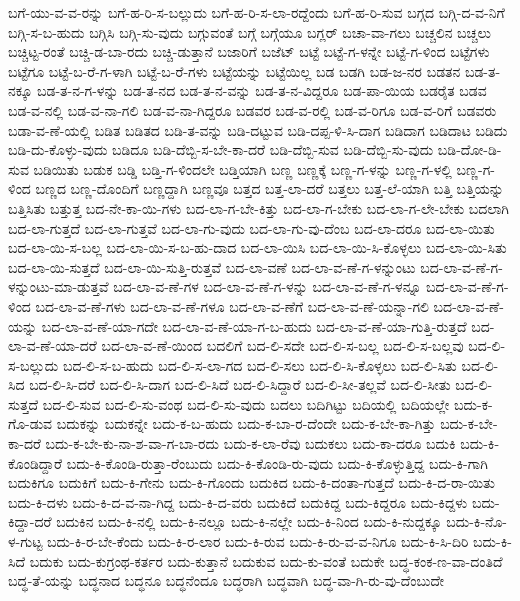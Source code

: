 {ಬಗೆ-ಯು-ವ-ವ-ರನ್ನು
ಬಗೆ-ಹ-ರಿ-ಸ-ಬಲ್ಲುದು
ಬಗೆ-ಹ-ರಿ-ಸ-ಲಾ-ರದ್ದೆಂದು
ಬಗೆ-ಹ-ರಿ-ಸುವ
ಬಗ್ಗದ
ಬಗ್ಗಿ-ದ-ವ-ನಿಗೆ
ಬಗ್ಗಿ-ಸ-ಬ-ಹುದು
ಬಗ್ಗಿಸಿ
ಬಗ್ಗಿ-ಸು-ವುದು
ಬಗ್ಗುವಂತೆ
ಬಗ್ಗೆ
ಬಗ್ಗೆಯೂ
ಬಗ್ಲರ್
ಬಚಾ-ವಾ-ಗಲು
ಬಚ್ಚಲಿನ
ಬಚ್ಚಲು
ಬಚ್ಚಿಟ್ಟ-ರಂತೆ
ಬಚ್ಚಿ-ಡ-ಬಾ-ರದು
ಬಚ್ಚಿ-ಡುತ್ತಾನೆ
ಬಜಾರಿಗೆ
ಬಜೆಟ್
ಬಟ್ಟೆ
ಬಟ್ಟೆ-ಗ-ಳನ್ನೇ
ಬಟ್ಟೆ-ಗ-ಳಿಂದ
ಬಟ್ಟೆಗಳು
ಬಟ್ಟೆಗೂ
ಬಟ್ಟೆ-ಬ-ರೆ-ಗ-ಳಾಗಿ
ಬಟ್ಟೆ-ಬ-ರೆ-ಗಳು
ಬಟ್ಟೆಯನ್ನು
ಬಟ್ಟೆಯಿಲ್ಲ
ಬಡ
ಬಡಗಿ
ಬಡ-ಜ-ನರ
ಬಡತನ
ಬಡ-ತ-ನಕ್ಕೂ
ಬಡ-ತ-ನ-ಗ-ಳನ್ನು
ಬಡ-ತ-ನದ
ಬಡ-ತ-ನ-ವನ್ನು
ಬಡ-ತ-ನ-ವಿದ್ದರೂ
ಬಡ-ಪಾ-ಯಿಯ
ಬಡರೈತ
ಬಡವ
ಬಡ-ವ-ನಲ್ಲಿ
ಬಡ-ವ-ನಾ-ಗಲಿ
ಬಡ-ವ-ನಾ-ಗಿದ್ದರೂ
ಬಡವರ
ಬಡ-ವ-ರಲ್ಲಿ
ಬಡ-ವ-ರಿಗೂ
ಬಡ-ವ-ರಿಗೆ
ಬಡವರು
ಬಡಾ-ವ-ಣೆ-ಯಲ್ಲಿ
ಬಡಿತ
ಬಡಿತದ
ಬಡಿ-ತ-ವನ್ನು
ಬಡಿ-ದಟ್ಟುವ
ಬಡಿ-ದಪ್ಪ-ಳಿ-ಸಿ-ದಾಗ
ಬಡಿದಾಗ
ಬಡಿದಾಟ
ಬಡಿದು
ಬಡಿ-ದು-ಕೊಳ್ಳು-ವುದು
ಬಡಿದೂ
ಬಡಿ-ದೆಬ್ಬಿ-ಸ-ಬೇ-ಕಾ-ದರೆ
ಬಡಿ-ದೆಬ್ಬಿ-ಸುವ
ಬಡಿ-ದೆಬ್ಬಿ-ಸು-ವುದು
ಬಡಿ-ದೋ-ಡಿ-ಸುವ
ಬಡಿಯಿತು
ಬಡುಕ
ಬಡ್ಡಿ
ಬಡ್ತಿ-ಗ-ಳಿಂದಲೇ
ಬಡ್ತಿಯಾಗಿ
ಬಣ್ಣ
ಬಣ್ಣಕ್ಕೆ
ಬಣ್ಣ-ಗ-ಳನ್ನು
ಬಣ್ಣ-ಗ-ಳಲ್ಲಿ
ಬಣ್ಣ-ಗ-ಳಿಂದ
ಬಣ್ಣದ
ಬಣ್ಣ-ದೊಂದಿಗೆ
ಬಣ್ಣದ್ದಾಗಿ
ಬಣ್ಣವೂ
ಬತ್ತದ
ಬತ್ತ-ಲಾ-ದರೆ
ಬತ್ತಲು
ಬತ್ತ-ಲೆ-ಯಾಗಿ
ಬತ್ತಿ
ಬತ್ತಿಯನ್ನು
ಬತ್ತಿಸಿತು
ಬತ್ತುತ್ತ
ಬದ-ನೇ-ಕಾ-ಯಿ-ಗಳು
ಬದ-ಲಾ-ಗ-ಬೇ-ಕಿತ್ತು
ಬದ-ಲಾ-ಗ-ಬೇಕು
ಬದ-ಲಾ-ಗ-ಲೇ-ಬೇಕು
ಬದಲಾಗಿ
ಬದ-ಲಾ-ಗುತ್ತದೆ
ಬದ-ಲಾ-ಗುತ್ತವೆ
ಬದ-ಲಾ-ಗು-ವುದು
ಬದ-ಲಾ-ಗು-ವು-ದೆಂಬ
ಬದ-ಲಾ-ದರೂ
ಬದ-ಲಾ-ಯಿತು
ಬದ-ಲಾ-ಯಿ-ಸ-ಬಲ್ಲ
ಬದ-ಲಾ-ಯಿ-ಸ-ಬ-ಹು-ದಾದ
ಬದ-ಲಾ-ಯಿಸಿ
ಬದ-ಲಾ-ಯಿ-ಸಿ-ಕೊಳ್ಳಲು
ಬದ-ಲಾ-ಯಿ-ಸಿತು
ಬದ-ಲಾ-ಯಿ-ಸುತ್ತದೆ
ಬದ-ಲಾ-ಯಿ-ಸುತ್ತಿ-ರುತ್ತವೆ
ಬದ-ಲಾ-ವಣೆ
ಬದ-ಲಾ-ವ-ಣೆ-ಗ-ಳನ್ನುಂಟು
ಬದ-ಲಾ-ವ-ಣೆ-ಗ-ಳನ್ನುಂಟು-ಮಾ-ಡುತ್ತವೆ
ಬದ-ಲಾ-ವ-ಣೆ-ಗಳ
ಬದ-ಲಾ-ವ-ಣೆ-ಗ-ಳನ್ನು
ಬದ-ಲಾ-ವ-ಣೆ-ಗ-ಳನ್ನೂ
ಬದ-ಲಾ-ವ-ಣೆ-ಗ-ಳಿಂದ
ಬದ-ಲಾ-ವ-ಣೆ-ಗಳು
ಬದ-ಲಾ-ವ-ಣೆ-ಗಳೂ
ಬದ-ಲಾ-ವ-ಣೆಗೆ
ಬದ-ಲಾ-ವ-ಣೆ-ಯನ್ನಾ-ಗಲಿ
ಬದ-ಲಾ-ವ-ಣೆ-ಯನ್ನು
ಬದ-ಲಾ-ವ-ಣೆ-ಯಾ-ಗದೇ
ಬದ-ಲಾ-ವ-ಣೆ-ಯಾ-ಗ-ಬ-ಹುದು
ಬದ-ಲಾ-ವ-ಣೆ-ಯಾ-ಗುತ್ತಿ-ರುತ್ತದೆ
ಬದ-ಲಾ-ವ-ಣೆ-ಯಾ-ದರೆ
ಬದ-ಲಾ-ವ-ಣೆ-ಯಿಂದ
ಬದಲಿಗೆ
ಬದ-ಲಿ-ಸದೇ
ಬದ-ಲಿ-ಸ-ಬಲ್ಲ
ಬದ-ಲಿ-ಸ-ಬಲ್ಲವು
ಬದ-ಲಿ-ಸ-ಬಲ್ಲುದು
ಬದ-ಲಿ-ಸ-ಬ-ಹುದು
ಬದ-ಲಿ-ಸ-ಲಾ-ಗದ
ಬದ-ಲಿ-ಸಲು
ಬದ-ಲಿ-ಸಿ-ಕೊಳ್ಳಲು
ಬದ-ಲಿ-ಸಿತು
ಬದ-ಲಿ-ಸಿದ
ಬದ-ಲಿ-ಸಿ-ದರೆ
ಬದ-ಲಿ-ಸಿ-ದಾಗ
ಬದ-ಲಿ-ಸಿದೆ
ಬದ-ಲಿ-ಸಿದ್ದಾರೆ
ಬದ-ಲಿ-ಸೀ-ತಲ್ಲವೆ
ಬದ-ಲಿ-ಸೀತು
ಬದ-ಲಿ-ಸುತ್ತದೆ
ಬದ-ಲಿ-ಸುವ
ಬದ-ಲಿ-ಸು-ವಂಥ
ಬದ-ಲಿ-ಸು-ವುದು
ಬದಲು
ಬದಿಗಿಟ್ಟು
ಬದಿಯಲ್ಲಿ
ಬದಿಯಲ್ಲೇ
ಬದು-ಕ-ಗೊ-ಡುವ
ಬದುಕನ್ನು
ಬದುಕನ್ನೇ
ಬದು-ಕ-ಬ-ಹುದು
ಬದು-ಕ-ಬಾ-ರ-ದೆಂದೇ
ಬದು-ಕ-ಬೇ-ಕಾ-ಗಿತ್ತು
ಬದು-ಕ-ಬೇ-ಕಾ-ದರೆ
ಬದು-ಕ-ಬೇ-ಕು-ನಾ-ಶ-ವಾ-ಗ-ಬಾ-ರದು
ಬದು-ಕ-ಲಾ-ರೆವು
ಬದುಕಲು
ಬದು-ಕಾ-ದರೂ
ಬದುಕಿ
ಬದು-ಕಿ-ಕೊಂಡಿದ್ದಾರೆ
ಬದು-ಕಿ-ಕೊಂಡಿ-ರುತ್ತಾ-ರೆಂಬುದು
ಬದು-ಕಿ-ಕೊಂಡಿ-ರು-ವುದು
ಬದು-ಕಿ-ಕೊಳ್ಳುತ್ತಿದ್ದ
ಬದು-ಕಿ-ಗಾಗಿ
ಬದುಕಿಗೂ
ಬದುಕಿಗೆ
ಬದು-ಕಿ-ಗೇನು
ಬದು-ಕಿ-ಗೊಂದು
ಬದುಕಿದ
ಬದು-ಕಿ-ದಂತಾ-ಗುತ್ತದೆ
ಬದು-ಕಿ-ದ-ರಾ-ಯಿತು
ಬದು-ಕಿ-ದಳು
ಬದು-ಕಿ-ದ-ವ-ನಾ-ಗಿದ್ದ
ಬದು-ಕಿ-ದ-ವರು
ಬದುಕಿದೆ
ಬದುಕಿದ್ದ
ಬದು-ಕಿದ್ದರೂ
ಬದು-ಕಿದ್ದಳು
ಬದು-ಕಿದ್ದಾ-ದರೆ
ಬದುಕಿನ
ಬದು-ಕಿ-ನಲ್ಲಿ
ಬದು-ಕಿ-ನಲ್ಲೂ
ಬದು-ಕಿ-ನಲ್ಲೇ
ಬದು-ಕಿ-ನಿಂದ
ಬದು-ಕಿ-ನುದ್ದಕ್ಕೂ
ಬದು-ಕಿ-ನೊ-ಳ-ಗುಟ್ಟ
ಬದು-ಕಿ-ರ-ಬೇ-ಕೆಂದು
ಬದು-ಕಿ-ರ-ಲಾರ
ಬದು-ಕಿ-ರುವ
ಬದು-ಕಿ-ರು-ವ-ವ-ನಿಗೂ
ಬದು-ಕಿ-ಸಿ-ದಿರಿ
ಬದು-ಕಿ-ಸಿದೆ
ಬದುಕು
ಬದು-ಕುಗ್ರಂಥ-ಕರ್ತರ
ಬದು-ಕುತ್ತಾನೆ
ಬದುಕುವ
ಬದು-ಕು-ವಂತೆ
ಬದುಕೇ
ಬದ್ಧ-ಕಂಕ-ಣ-ವಾ-ದಂತಿದೆ
ಬದ್ಧ-ತೆ-ಯನ್ನು
ಬದ್ಧನಾದ
ಬದ್ಧನೂ
ಬದ್ಧನೆಂದೂ
ಬದ್ಧರಾಗಿ
ಬದ್ಧವಾಗಿ
ಬದ್ಧ-ವಾ-ಗಿ-ರು-ವು-ದೆಂಬುದೇ
}
